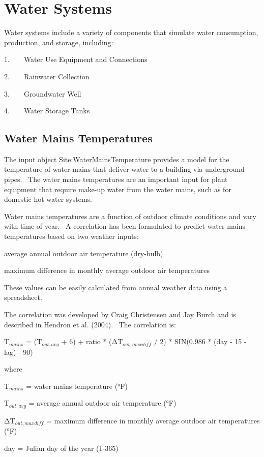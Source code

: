 \section{Water Systems }\label{water-systems}

Water systems include a variety of components that simulate water consumption, production, and storage, including:

1.~~~~Water Use Equipment and Connections

2.~~~~Rainwater Collection

3.~~~~Groundwater Well

4.~~~~Water Storage Tanks

\subsection{Water Mains Temperatures}\label{water-mains-temperatures}

The input object Site:WaterMainsTemperature provides a model for the temperature of water mains that deliver water to a building via underground pipes.~ The water mains temperatures are an important input for plant equipment that require make-up water from the water mains, such as for domestic hot water systems.

Water mains temperatures are a function of outdoor climate conditions and vary with time of year.~ A correlation has been formulated to predict water mains temperatures based on two weather inputs:

average annual outdoor air temperature (dry-bulb)

maximum difference in monthly average outdoor air temperatures

These values can be easily calculated from annual weather data using a spreadsheet.

The correlation was developed by Craig Christensen and Jay Burch and is described in Hendron et al. (2004).~ The correlation is:

T\(_{mains}\) = (T\(_{out,avg}\) + 6) + ratio * (ΔT\(_{out,maxdiff}\) / 2) * SIN(0.986 * (day - 15 - lag) - 90)

where

T\(_{mains}\) = water mains temperature (°F)

T\(_{out,avg}\) = average annual outdoor air temperature (°F)

ΔT\(_{out,maxdiff}\) = maximum difference in monthly average outdoor air temperatures (°F)

day = Julian day of the year (1-365)

